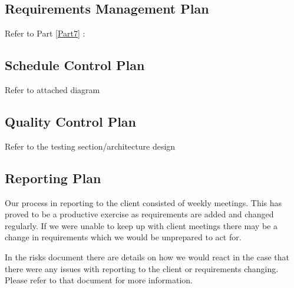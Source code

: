 \subsection{Requirements Management Plan}

Refer to Part \ref{Part7} : 


\subsection{Schedule Control Plan}

Refer to attached diagram


\subsection{Quality Control Plan}

Refer to the testing section/architecture design


\subsection{Reporting Plan}

Our process in reporting to the client consisted of weekly meetings. This has proved to be a productive exercise as requirements are added and changed regularly. If we were unable to keep up with client meetings there may be a change in requirements which we would be unprepared to act for.

In the risks document there are details on how we would react in the case that there were any issues with reporting to the client or requirements changing. Please refer to that document for more information.


